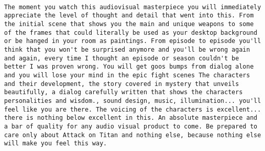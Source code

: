 \documentclass[
]{article}
\begin{document}
\begin{verbatim}
                                                                                                                                                                                                                                                                                                                                                                                                                                                                                                                                                                                                                                                                                                                                                                                                                                                                                                                                                                                                                                                                                                                                                                                                                                                                                                                                                                                                                                                                                                                                                                                                                                                                                                                                                                                                                                                                                                                                                                                                                                                                                   The moment you watch this audiovisual masterpiece you will immediately appreciate the level of thought and detail that went into this. From the initial scene that shows you the main and unique weapons to some of the frames that could literally be used as your desktop background or be hanged in your room as paintings. From episode to episode you'll think that you won't be surprised anymore and you'll be wrong again and again, every time I thought an episode or season couldn't be better I was proven wrong. You will get goos bumps from dialog alone and you will lose your mind in the epic fight scenes The characters and their development, the story covered in mystery that unveils beautifully, a dialog carefully written that shows the characters personalities and wisdom., sound design, music, illumination... you'll feel like you are there. The voicing of the characters is excellent... there is nothing below excellent in this. An absolute masterpiece and a bar of quality for any audio visual product to come. Be prepared to care only about Attack on Titan and nothing else, because nothing else will make you feel this way.

\end{verbatim}
\end{document}
